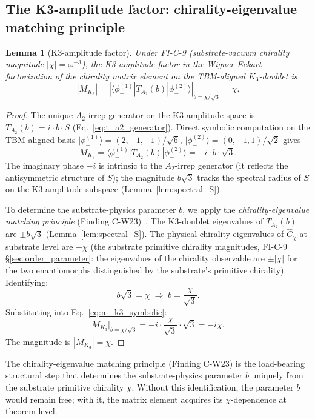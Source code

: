 \documentclass[11pt,letterpaper]{article}
\newtheorem{lemma}[theorem]{Lemma}
\newcommand{\phig}{\varphi}
\newcommand{\Kthree}{\ensuremath{K_3}}
\newcommand{\Cchi}{\hat{C}_\chi}
\newcommand{\phiminusOne}{|\phi_-^{(1)}\rangle}
\newcommand{\phiminusTwo}{|\phi_-^{(2)}\rangle}
\begin{document}
\subsection{The K3-amplitude factor: chirality-eigenvalue matching principle}\label{sec:k3_amplitude_factor}

\begin{lemma}[K3-amplitude factor]\label{lem:k3_factor}
Under FI-C-9 (substrate-vacuum chirality magnitude $|\chi| = \phig^{-3}$), the K3-amplitude factor in the Wigner-Eckart factorization of the chirality matrix element on the TBM-aligned $\Kthree$-doublet is
\[
|M_{\Kthree}| = |\langle \phi_-^{(1)} | T_{A_2}(b) | \phi_-^{(2)} \rangle|_{b = \chi/\sqrt{3}} = \chi.
\]
\end{lemma}

\begin{proof}
The unique $A_2$-irrep generator on the K3-amplitude space is $T_{A_2}(b) = i \cdot b \cdot S$ (Eq.~\eqref{eq:t_a2_generator}). Direct symbolic computation on the TBM-aligned basis $\phiminusOne = (2,-1,-1)/\sqrt{6}$, $\phiminusTwo = (0,-1,1)/\sqrt{2}$ gives
\begin{equation}\label{eq:m_k3_symbolic}
M_{\Kthree} = \langle \phi_-^{(1)} | T_{A_2}(b) | \phi_-^{(2)} \rangle = -i \cdot b \cdot \sqrt{3}.
\end{equation}
The imaginary phase $-i$ is intrinsic to the $A_2$-irrep generator (it reflects the antisymmetric structure of $S$); the magnitude $b\sqrt{3}$ tracks the spectral radius of $S$ on the K3-amplitude subspace (Lemma~\ref{lem:spectral_S}).

To determine the substrate-physics parameter $b$, we apply the \emph{chirality-eigenvalue matching principle} (Finding C-W23)~\cite{abshier_capotauro_subclaim_c_sketch}. The K3-doublet eigenvalues of $T_{A_2}(b)$ are $\pm b\sqrt{3}$ (Lemma~\ref{lem:spectral_S}). The physical chirality eigenvalues of $\Cchi$ at substrate level are $\pm \chi$ (the substrate primitive chirality magnitudes, FI-C-9 \S\ref{sec:order_parameter}: the eigenvalues of the chirality observable are $\pm |\chi|$ for the two enantiomorphs distinguished by the substrate's primitive chirality). Identifying:
\[
b\sqrt{3} = \chi \;\Longrightarrow\; b = \frac{\chi}{\sqrt{3}}.
\]
Substituting into Eq.~\eqref{eq:m_k3_symbolic}:
\[
M_{\Kthree}\big|_{b = \chi/\sqrt{3}} = -i \cdot \frac{\chi}{\sqrt{3}} \cdot \sqrt{3} = -i\chi.
\]
The magnitude is $|M_{\Kthree}| = \chi$.
\end{proof}

The chirality-eigenvalue matching principle (Finding C-W23) is the load-bearing structural step that determines the substrate-physics parameter $b$ uniquely from the substrate primitive chirality $\chi$. Without this identification, the parameter $b$ would remain free; with it, the matrix element acquires its $\chi$-dependence at theorem level.
\end{document}

